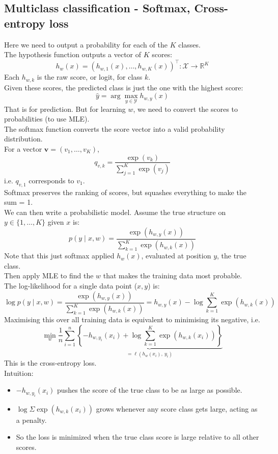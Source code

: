 \documentclass[../Probability.tex]{subfiles}
\begin{document}
\subsection{Multiclass classification - Softmax, Cross-entropy loss}
Here we need to output a probability for each of the $K$ classes.\\
The hypothesis function outputs a vector of $K$ scores:
$$h_w(x) = (h_{w,1}(x), \ldots, h_{w,K}(x))^\top : \mathcal{X} \to \mathbb{R}^K$$
Each $h_{w,k}$ is the raw score, or logit, for class $k$.\\
Given these scores, the predicted class is just the one with the highest score:
$$\hat{y} = \arg\max_{y \in \mathcal{Y}} h_{w,y}(x)$$
That is for prediction. But for learning $w$, we need to convert the scores to probabilities (to use MLE).\\
The softmax function converts the score vector into a valid probability distribution.\\
For a vector $\mathbf{v} = (v_1,\ldots,v_K)$,
$$q_{v,k} = \frac{\exp(v_k)}{\sum_{j=1}^{K} \exp(v_j)}$$
i.e. $q_{v,1}$ corresponds to $v_1$.\\
Softmax preserves the ranking of scores, but squashes everything to make the sum = 1.\\
We can then write a probabilistic model. Assume the true structure on $y \in \{1,\ldots,K\}$ given $x$ is:
$$p(y \mid x, w) = \frac{\exp(h_{w,y}(x))}{\sum_{k=1}^{K} \exp(h_{w,k}(x))}$$
Note that this just softmax applied $h_w(x)$, evaluated at position $y$, the true class.\\
Then apply MLE to find the $w$ that makes the training data most probable.\\
The log-likelihood for a single data point ($x, y$) is:
$$\log p(y \mid x, w) = \frac{\exp(h_{w,y}(x))}{\sum_{k=1}^K \exp(h_{w,k}(x))} = h_{w,y}(x) - \log \sum_{k=1}^{K} \exp(h_{w,k}(x))$$
Maximising this over all training data is equivalent to minimising its negative, i.e.
$$\min_w \frac{1}{n} \sum_{i=1}^{n} \underbrace{\left\{ -h_{w,y_i}(x_i) + \log \sum_{k=1}^{K} \exp(h_{w,k}(x_i)) \right\}}_{= \ell(h_w(x_i),\ y_i)}$$
This is the cross-entropy loss.\\
Intuition:
\begin{itemize}
    \item $-h_{w,y_i}(x_i)$ pushes the score of the true class to be as large as possible.
    \item $\log \Sigma \exp(h_{w,k}(x_i))$ grows whenever any score class gets large, acting as a penalty.
    \item So the loss is minimized when the true class score is large relative to all other scores.
\end{itemize}
\end{document}
